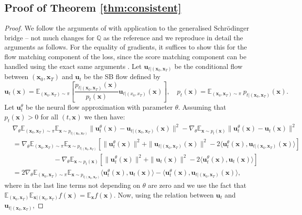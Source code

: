 \documentclass{article}
\newcommand{\E}{\mathbb{E}}
\theoremstyle{newstyle}
\begin{document}
\subsection{Proof of Theorem \ref{thm:consistent}}
\begin{proof}
  We follow the arguments of \cite{tong2023simulation} with application to the generalised Schr\"odinger bridge -- not much changes for $\mathbb{Q}$ as the reference and we reproduce in detail the arguments as follows. For the equality of gradients, it suffices to show this for the flow matching component of the loss, since the score matching component can be handled using the exact same arguments \cite{tong2023simulation}. Let $\bm{u}_{t | (\bm{x}_0, \bm{x}_T)}$ be the conditional flow between $(\bm{x}_0, \bm{x}_T)$ and $\bm{u}_t$ be the SB flow defined by
  \[
    \bm{u}_t(\bm{x}) = \E_{(\bm{x}_0, \bm{x}_T) \sim \pi}\left[\frac{p_{t | (\bm{x}_0, \bm{x}_T)}(\bm{x})}{p_t(\bm{x})} \bm{u}_{t | (x_0, x_T)}(\bm{x})\right], \quad p_t(\bm{x}) = \E_{(\bm{x}_0, \bm{x}_T) \sim \pi} \: p_{t | (\bm{x}_0, \bm{x}_T)}(\bm{x}). 
  \]
  Let $\bm{u}_t^\theta$ be the neural flow approximation with parameter $\theta$. Assuming that $p_t(\bm{x}) > 0$ for all $(t, \bm{x})$ we then have:
  \begin{align}
    &\nabla_\theta \E_{(\bm{x}_0, \bm{x}_T) \sim \pi} \E_{\bm{x} \sim p_{t | (\bm{x}_0, \bm{x}_T)}} \| \bm{u}^\theta_t(\bm{x}) - \bm{u}_{t | (\bm{x}_0, \bm{x}_T)}(\bm{x}) \|^2 - \nabla_\theta \E_{\bm{x} \sim p_t(\bm{x})} \| \bm{u}_t^\theta(\bm{x}) - \bm{u}_t(\bm{x}) \|^2 \\
    &= \nabla_\theta \E_{(\bm{x}_0, \bm{x}_T) \sim \pi} \E_{\bm{x} \sim p_{t | (\bm{x}_0, \bm{x}_T)}} \left[ \| \bm{u}^\theta_t(\bm{x}) \|^2 + \| \bm{u}_{t | (\bm{x}_0, \bm{x}_T)}(\bm{x}) \|^2 - 2\langle \bm{u}^\theta_t(\bm{x}), \bm{u}_{t | (\bm{x}_0, \bm{x}_T)}(\bm{x}) \rangle \right] \\
    &\qquad\qquad\qquad - \nabla_\theta \E_{\bm{x} \sim p_t(\bm{x})} \left[ \| \bm{u}_t^\theta(\bm{x}) \|^2 + \| \bm{u}_t(\bm{x}) \|^2 - 2\langle \bm{u}_t^\theta(\bm{x}), \bm{u}_t(\bm{x})  \rangle \right] \\
    &= 2 \nabla_\theta \E_{(\bm{x}_0, \bm{x}_T) \sim \pi} \E_{\bm{x} \sim p_{t | (\bm{x}_0, \bm{x}_T)}} \langle \bm{u}_t^\theta(\bm{x}), \bm{u}_t(\bm{x}) \rangle - \langle \bm{u}_t^\theta(\bm{x}), \bm{u}_{t | (\bm{x}_0, \bm{x}_T)}(\bm{x}) \rangle , 
  \end{align}
  where in the last line terms not depending on $\theta$ are zero and we use the fact that $\E_{(\bm{x}_0, \bm{x}_T)} \E_{\bm{x} | (\bm{x}_0, \bm{x}_T)} f(\bm{x}) = \E_{\bm{x}} f(\bm{x})$. Now, using the relation between $\bm{u}_t$ and $\bm{u}_{t | (\bm{x}_0, \bm{x}_T)}$, 

\end{proof}
\end{document}

